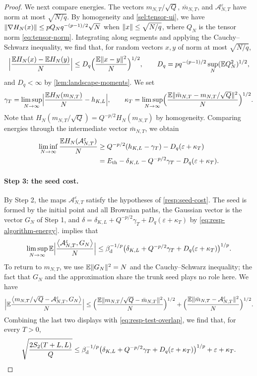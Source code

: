 \begin{proof}
We next compare energies. The vectors $m_{N,T}/\sqrt Q$, $\bar m_{N,T}$, and $\mathcal A^\varepsilon_{N,T}$ have norm at most $\sqrt{N/q}$. By homogeneity and \eqref{sel:tensor-ui}, we have $\lVert\nabla H_N(x)\rVert\le pQ_Nq^{-(p-1)/2}\sqrt N$ when $\lVert x\rVert\le\sqrt{N/q}$, where $Q_N$ is the tensor norm \eqref{eq:tensor-norm}. Integrating along segments and applying the Cauchy--Schwarz inequality, we find that, for random vectors $x,y$ of norm at most $\sqrt{N/q}$,
\[
 \Bigl|\frac{\mathbb E H_N(x)-\mathbb E H_N(y)}N\Bigr|\le D_q\Bigl(\frac{\mathbb E\lVert x-y\rVert^2}N\Bigr)^{1/2},
 \qquad D_q=pq^{-(p-1)/2}\sup_N(\mathbb E Q_N^2)^{1/2},
\]
and $D_q<\infty$ by \cref{lem:landscape-moments}. We set
\[
 \gamma_T=\limsup_{N\to\infty}\Bigl|\frac{\mathbb E H_N(m_{N,T})}N-h_{K,L}\Bigr|,
 \qquad
 \kappa_T=\limsup_{N\to\infty}\Bigl(\frac{\mathbb E\lVert\bar m_{N,T}-m_{N,T}/\sqrt Q\rVert^2}N\Bigr)^{1/2}.
\]
Note that $H_N(m_{N,T}/\sqrt Q)=Q^{-p/2}H_N(m_{N,T})$ by homogeneity. Comparing energies through the intermediate vector $\bar m_{N,T}$, we obtain
\begin{equation}\label{eq:resp-algorithm-energy}
\begin{aligned}
 \liminf_{N\to\infty}\frac{\mathbb E H_N(\mathcal A^\varepsilon_{N,T})}N
 &\ge Q^{-p/2}(h_{K,L}-\gamma_T)-D_q(\varepsilon+\kappa_T)\\
 &=E_{\mathrm{th}}-\delta_{K,L}-Q^{-p/2}\gamma_T-D_q(\varepsilon+\kappa_T).
\end{aligned}
\end{equation}

\paragraph{Step 3: the seed cost.}
By Step 2, the maps $\mathcal A^\varepsilon_{N,T}$ satisfy the hypotheses of \cref{resp:seed-cost}. The seed is formed by the initial point and all Brownian paths, the Gaussian vector is the vector $G_N$ of Step 1, and $\delta=\delta_{K,L}+Q^{-p/2}\gamma_T+D_q(\varepsilon+\kappa_T)$ by \eqref{eq:resp-algorithm-energy}.  implies that
\[
 \limsup_{N\to\infty}\mathbb E\Bigl|\frac{\left\langle\mathcal A^\varepsilon_{N,T},G_N\right\rangle}N\Bigr|
 \le\beta_{\mathrm d}^{-1/p}\bigl(\delta_{K,L}+Q^{-p/2}\gamma_T+D_q(\varepsilon+\kappa_T)\bigr)^{1/p}.
\]
To return to $m_{N,T}$, we use $\mathbb E\lVert G_N\rVert^2=N$ and the Cauchy--Schwarz inequality; the fact that $G_N$ and the approximation share the trunk seed plays no role here. We have
\[
 \Bigl|\mathbb E\frac{\left\langle m_{N,T}/\sqrt Q-\mathcal A^\varepsilon_{N,T},G_N\right\rangle}N\Bigr|
 \le\Bigl(\frac{\mathbb E\lVert m_{N,T}/\sqrt Q-\bar m_{N,T}\rVert^2}N\Bigr)^{1/2}
 +\Bigl(\frac{\mathbb E\lVert\bar m_{N,T}-\mathcal A^\varepsilon_{N,T}\rVert^2}N\Bigr)^{1/2}.
\]
Combining the last two displays with \eqref{eq:resp-test-overlap}, we find that, for every $T>0$,
\begin{equation}\label{eq:resp-fixed-T-bound}
 \sqrt{\frac{2S_2(T+L,L)}Q}
 \le\beta_{\mathrm d}^{-1/p}\bigl(\delta_{K,L}+Q^{-p/2}\gamma_T+D_q(\varepsilon+\kappa_T)\bigr)^{1/p}+\varepsilon+\kappa_T.
\end{equation}


\end{proof}
